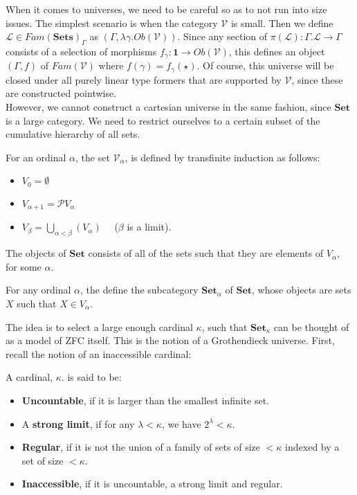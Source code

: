 When it comes to universes, we need to be careful so as to not run into size issues. The simplest scenario is when the category $\mathcal{V}$ is small. Then we define $\mathcal{L} \in Fam(\mathbf{Sets})_\Gamma$ as $(\Gamma, \lambda \gamma . Ob(\mathcal{V}))$. Since any section of $\pi(\mathcal{L}) : \Gamma.\mathcal{L} \to \Gamma$ consists of a selection of morphisms $f_\gamma : \mathbf{1} \to Ob(\mathcal{V})$, this defines an object $(\Gamma, f)$ of $Fam(\mathcal{V})$ where $f(\gamma) = f_\gamma(\star)$. Of course, this universe will be closed under all purely linear type formers that are supported by $\mathcal{V}$, since these are constructed pointwise.\\
However, we cannot construct a cartesian universe in the same fashion, since $\mathbf{Set}$ is a large category. We need to restrict ourselves to a certain subset of the cumulative hierarchy of all sets.
\begin{defn}For an ordinal $\alpha$, the set $\mathcal{V}_{\alpha}$, is defined by transfinite induction as follows:
  \begin{itemize}
  \item $V_0 = \emptyset$
  \item $V_{\alpha + 1} = \mathcal{P}V_\alpha$
  \item $V_{\beta} = \bigcup_{\alpha < \beta}(V_\alpha) \quad $ ($\beta$ is a limit).
  \end{itemize}
\end{defn}
The objects of $\mathbf{Set}$ consists of all of the sets such that they are elements of $V_\alpha$, for some $\alpha$.
\begin{defn}
  For any ordinal $\alpha$, the define the subcategory $\mathbf{Set}_\alpha$ of $\mathbf{Set}$, whose objects are sets $X$ such that $X \in V_\alpha$. 
\end{defn}
The idea is to select a large enough cardinal $\kappa$, such that $\mathbf{Set}_\kappa$ can be thought of as a model of ZFC itself. This is the notion of a Grothendieck universe. First, recall the notion of an inaccessible cardinal:
\begin{defn}A cardinal, $\kappa$. is said to be:
  \begin{itemize}
  \item \textbf{Uncountable}, if it is larger than the smallest infinite set.
  \item A \textbf{strong limit}, if for any $\lambda < \kappa$, we have $2^\lambda < \kappa$.
  \item \textbf{Regular}, if it is not the union of a family of sets of size  $<\kappa$ indexed by a set of size $< \kappa$.
  \item \textbf{Inaccessible}, if it is uncountable, a strong limit and regular.
  \end{itemize}
\end{defn}
